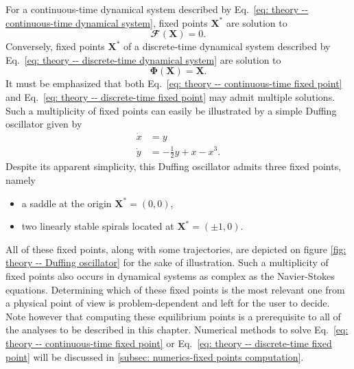   For a continuous-time dynamical system described by Eq.~\eqref{eq: theory -- continuous-time dynamical system}, fixed points $\mathbf{X}^{*}$ are solution to
  \begin{equation}
    \mathbfcal{F}\left( \mathbf{X} \right) = 0.
    \label{eq: theory -- continuous-time fixed point}
  \end{equation}
  Conversely, fixed points $\mathbf{X}^*$ of a discrete-time dynamical system described by Eq.~\eqref{eq: theory -- discrete-time dynamical system} are solution to
  \begin{equation}
    \bm{\Phi} \left( \mathbf{X} \right) = \mathbf{X}.
    \label{eq: theory -- discrete-time fixed point}
  \end{equation}
  It must be emphasized that both Eq.~\eqref{eq: theory -- continuous-time fixed point} and Eq.~\eqref{eq: theory -- discrete-time fixed point} may admit multiple solutions. Such a multiplicity of fixed points can easily be illustrated by a simple Duffing oscillator given by
  \begin{equation}
    \begin{aligned}
      \dot{x} & = y \\
      \dot{y} & = -\displaystyle \frac{1}{2} y + x - x^3.
    \end{aligned}
    \label{eq: theory -- Duffing oscillator}
  \end{equation}
  Despite its apparent simplicity, this Duffing oscillator admits three fixed points, namely
  \begin{itemize}
    \item a saddle at the origin $\mathbf{X}^* = (0, 0)$,
    \item two linearly stable spirals located at $\mathbf{X}^* = (\pm 1, 0)$.
  \end{itemize}
  All of these fixed points, along with some trajectories, are depicted on figure \ref{fig: theory -- Duffing oscillator} for the sake of illustration. Such a multiplicity of fixed points also occurs in dynamical systems as complex as the Navier-Stokes equations. Determining which of these fixed points is the most relevant one from a physical point of view is problem-dependent and left for the user to decide. Note however that computing these equilibrium points is a prerequisite to all of the analyses to be described in this chapter. Numerical methods to solve Eq.~\eqref{eq: theory -- continuous-time fixed point} or Eq.~\eqref{eq: theory -- discrete-time fixed point} will be discussed in \textsection \ref{subsec: numerics-fixed points computation}.

